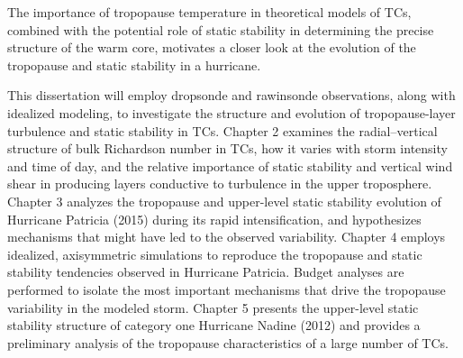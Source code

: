 The importance of tropopause temperature in theoretical models of TCs, combined with the potential role of static stability in determining the precise structure of the warm core, motivates a closer look at the evolution of the tropopause and static stability in a hurricane.

This dissertation will employ dropsonde and rawinsonde observations, along with idealized modeling, to investigate the structure and evolution of tropopause-layer turbulence and static stability in TCs.
Chapter 2 examines the radial--vertical structure of bulk Richardson number in TCs, how it varies with storm intensity and time of day, and the relative importance of static stability and vertical wind shear in producing layers conductive to turbulence in the upper troposphere.
Chapter 3 analyzes the tropopause and upper-level static stability evolution of Hurricane Patricia (2015) during its rapid intensification, and hypothesizes mechanisms that might have led to the observed variability.
Chapter 4 employs idealized, axisymmetric simulations to reproduce the tropopause and static stability tendencies observed in Hurricane Patricia.
Budget analyses are performed to isolate the most important mechanisms that drive the tropopause variability in the modeled storm.
Chapter 5 presents the upper-level static stability structure of category one Hurricane Nadine (2012) and provides a preliminary analysis of the tropopause characteristics of a large number of TCs.

\clearpage


